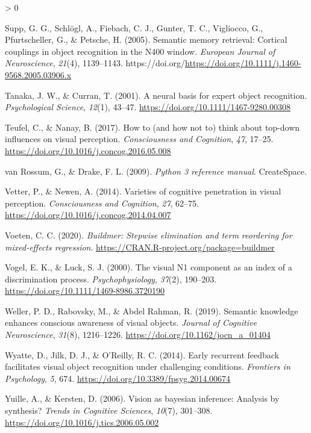 \documentclass[
  english,
  doc,12pt,twoside,floatsintext]{apa7}
\newlength{\cslhangindent}
\newenvironment{CSLReferences}[2] %
 {%
  \setlength{\parindent}{0pt}
  \ifodd #1 \everypar{\setlength{\hangindent}{\cslhangindent}}\ignorespaces\fi
  \ifnum #2 > 0
  \setlength{\parskip}{#2\baselineskip}
  \fi
 }%
 {}
\begin{document}
\begin{CSLReferences}{1}{0}
\leavevmode\hypertarget{ref-supp2005}{}%
Supp, G. G., Schlögl, A., Fiebach, C. J., Gunter, T. C., Vigliocco, G., Pfurtscheller, G., \& Petsche, H. (2005). Semantic memory retrieval: Cortical couplings in object recognition in the N400 window. \emph{European Journal of Neuroscience}, \emph{21}(4), 1139--1143. https://doi.org/\url{https://doi.org/10.1111/j.1460-9568.2005.03906.x}

\leavevmode\hypertarget{ref-tanaka2001}{}%
Tanaka, J. W., \& Curran, T. (2001). A neural basis for expert object recognition. \emph{Psychological Science}, \emph{12}(1), 43--47. \url{https://doi.org/10.1111/1467-9280.00308}

\leavevmode\hypertarget{ref-teufel2017}{}%
Teufel, C., \& Nanay, B. (2017). How to (and how not to) think about top-down influences on visual perception. \emph{Consciousness and Cognition}, \emph{47}, 17--25. \url{https://doi.org/10.1016/j.concog.2016.05.008}

\leavevmode\hypertarget{ref-vanrossum2009}{}%
van Rossum, G., \& Drake, F. L. (2009). \emph{Python 3 reference manual}. CreateSpace.

\leavevmode\hypertarget{ref-vetter2014}{}%
Vetter, P., \& Newen, A. (2014). Varieties of cognitive penetration in visual perception. \emph{Consciousness and Cognition}, \emph{27}, 62--75. \url{https://doi.org/10.1016/j.concog.2014.04.007}

\leavevmode\hypertarget{ref-R-buildmer}{}%
Voeten, C. C. (2020). \emph{Buildmer: Stepwise elimination and term reordering for mixed-effects regression}. \url{https://CRAN.R-project.org/package=buildmer}

\leavevmode\hypertarget{ref-vogel2000}{}%
Vogel, E. K., \& Luck, S. J. (2000). The visual {N1} component as an index of a discrimination process. \emph{Psychophysiology}, \emph{37}(2), 190--203. \url{https://doi.org/10.1111/1469-8986.3720190}

\leavevmode\hypertarget{ref-weller2019}{}%
Weller, P. D., Rabovsky, M., \& Abdel Rahman, R. (2019). Semantic knowledge enhances conscious awareness of visual objects. \emph{Journal of Cognitive Neuroscience}, \emph{31}(8), 1216--1226. \url{https://doi.org/10.1162/jocn_a_01404}

\leavevmode\hypertarget{ref-wyatte2014}{}%
Wyatte, D., Jilk, D. J., \& O'Reilly, R. C. (2014). Early recurrent feedback facilitates visual object recognition under challenging conditions. \emph{Frontiers in Psychology}, \emph{5}, 674. \url{https://doi.org/10.3389/fpsyg.2014.00674}

\leavevmode\hypertarget{ref-yuille2006}{}%
Yuille, A., \& Kersten, D. (2006). Vision as bayesian inference: Analysis by synthesis? \emph{Trends in Cognitive Sciences}, \emph{10}(7), 301--308. \url{https://doi.org/10.1016/j.tics.2006.05.002}

\end{CSLReferences}
\end{document}
